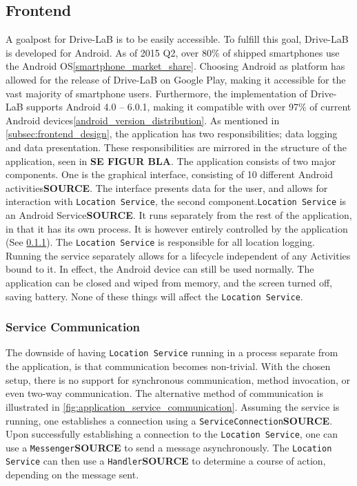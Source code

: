 \subsection{Frontend}\label{subsec:frontend_implementation}
A goalpost for Drive-LaB is to be easily accessible. To fulfill this goal, Drive-LaB is developed for Android. As of 2015 Q2, over 80\% of shipped smartphones use the Android OS\ref{smartphone_market_share}. Choosing Android as platform has allowed for the release of Drive-LaB on Google Play, making it accessible for the vast majority of smartphone users. Furthermore, the implementation of Drive-LaB supports Android 4.0 – 6.0.1, making it compatible with over 97\% of current Android devices\ref{android_version_distribution}.
As mentioned in \ref{subsec:frontend_design}, the application has two responsibilities; data logging and data presentation. These responsibilities are mirrored in the structure of the application, seen in \textbf{SE FIGUR BLA}. The application consists of two major components. One is the graphical interface, consisting of 10 different Android activities\textbf{SOURCE}. The interface presents data for the user, and allows for interaction with \texttt{Location Service}, the second component.\texttt{Location Service} is an Android Service\textbf{SOURCE}. It runs separately from the rest of the application, in that it has its own process. It is however entirely controlled by the application (See \ref{subsubsec:service_communication}). The \texttt{Location Service} is responsible for all location logging. Running the service separately allows for a lifecycle independent of any Activities bound to it. In effect, the Android device can still be used normally. The application can be closed and wiped from memory, and the screen turned off, saving battery. None of these things will affect the \texttt{Location Service}.

\subsubsection{Service Communication}\label{subsubsec:service_communication}
The downside of having \texttt{Location Service} running in a process separate from the application, is that communication becomes non-trivial. With the chosen setup, there is no support for synchronous communication, method invocation, or even two-way communication. The alternative method of communication is illustrated in \ref{fig:application_service_communication}. Assuming the service is running, one establishes a connection using a \texttt{ServiceConnection}\textbf{SOURCE}. Upon successfully establishing a connection to the \texttt{Location Service}, one can use a \texttt{Messenger}\textbf{SOURCE} to send a message asynchronously. The \texttt{Location Service} can then use a \texttt{Handler}\textbf{SOURCE} to determine a course of action, depending on the message sent.

